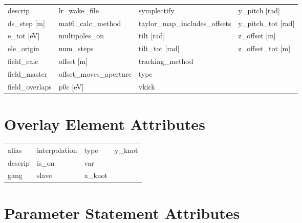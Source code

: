 \begin{tabular}{llll}
descrip                          & lr_wake_file                     & symplectify                      & y_pitch [rad]                    \\
ds_step [m]                      & mat6_calc_method                 & taylor_map_includes_offsets      & y_pitch_tot [rad]                \\
e_tot [eV]                       & multipoles_on                    & tilt [rad]                       & z_offset [m]                     \\
ele_origin                       & num_steps                        & tilt_tot [rad]                   & z_offset_tot [m]                 \\
field_calc                       & offset [m]                       & tracking_method                  &                                  \\
field_master                     & offset_moves_aperture            & type                             &                                  \\
field_overlaps                   & p0c [eV]                         & vkick                            &                                  \\
 \bottomrule
 \end{tabular}
 \vfill
 
 \section{Overlay Element Attributes}
 \label{s:list.overlay}
 
 \begin{tabular}{llll} \toprule
alias                            & interpolation                    & type                             & y_knot                           \\
descrip                          & is_on                            & var                              &                                  \\
gang                             & slave                            & x_knot                           &                                  \\
 \bottomrule
 \end{tabular}
 \vfill
 
 \section{Parameter Statement Attributes}
 \label{s:list.parameter}
 
